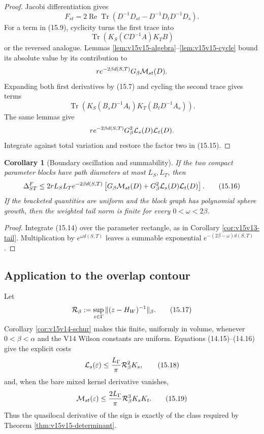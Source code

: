 \documentclass[11pt]{article}
\newtheorem{corollary}[theorem]{Corollary}
\theoremstyle{remark}
\begin{document}
\begin{proof}
Jacobi differentiation gives
\[
 F_{st}
 =
 2\operatorname{Re}\operatorname{Tr}
 \left(D^{-1}D_{st}-D^{-1}D_tD^{-1}D_s\right).              \tag{15.15}
\]
For a term in (15.9), cyclicity turns the first trace into
\[
 \operatorname{Tr}
 \left(
 K_S(CD^{-1}A)K_TB
 \right)
\]
or the reversed analogue.  Lemmas
\ref{lem:v15v15-algebra}--\ref{lem:v15v15-cycle} bound its absolute
value by its contribution to
\[
 r e^{-2\beta d(S,T)}G_\beta{\cal M}_{st}(D).
\]
Expanding both first derivatives by (15.7) and cycling the second
trace gives terms
\[
 \operatorname{Tr}\left(
 K_S(B_sD^{-1}A_t)K_T(B_tD^{-1}A_s)
 \right).
\]
The same lemmas give
\[
 r e^{-2\beta d(S,T)}
 G_\beta^2{\cal L}_s(D){\cal L}_t(D).
\]
Integrate against total variation and restore the factor two in
(15.15).
\end{proof}

\begin{corollary}[Boundary oscillation and summability]
\label{cor:v15v15-influence}
If the two compact parameter blocks have path diameters at most
\(L_S,L_T\), then
\[
 \Delta_{ST}^{F}
 \le
 2rL_SL_T e^{-2\beta d(S,T)}
 \left[
 G_\beta{\cal M}_{st}(D)
 +G_\beta^2{\cal L}_s(D){\cal L}_t(D)
 \right].                                                   \tag{15.16}
\]
If the bracketed quantities are uniform and the block graph has
polynomial sphere growth, then the weighted tail norm is finite for
every \(0<\omega<2\beta\).
\end{corollary}

\begin{proof}
Integrate (15.14) over the parameter rectangle, as in Corollary
\ref{cor:v15v13-tail}.  Multiplication by
\(e^{\omega d(S,T)}\) leaves a summable exponential
\(e^{-(2\beta-\omega)d(S,T)}\).
\end{proof}

\subsection{Application to the overlap contour}

Let
\[
 {\cal R}_\beta
 :=
 \sup_{z\in\Gamma}\|(z-H_W)^{-1}\|_\beta.                   \tag{15.17}
\]
Corollary \ref{cor:v15v14-schur} makes this finite, uniformly in
volume, whenever \(0<\beta<\alpha\) and the V14 Wilson constants are
uniform.  Equations (14.15)--(14.16) give the explicit costs
\[
 {\cal L}_s(\varepsilon)
 \le\frac{L_\Gamma}{\pi}{\cal R}_\beta^2K_s,                 \tag{15.18}
\]
and, when the bare mixed kernel derivative vanishes,
\[
 {\cal M}_{st}(\varepsilon)
 \le\frac{2L_\Gamma}{\pi}{\cal R}_\beta^3K_sK_t.             \tag{15.19}
\]
Thus the quasilocal derivative of the sign is exactly of the class
required by Theorem \ref{thm:v15v15-determinant}.
\end{document}
